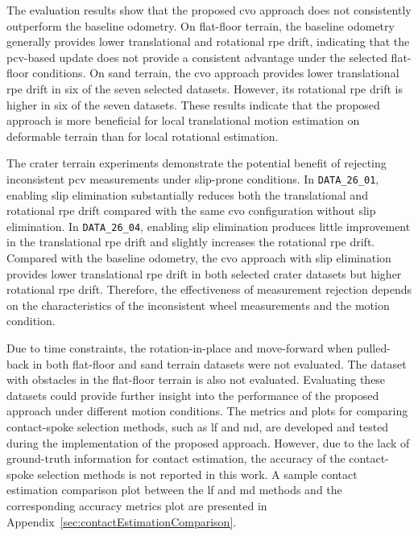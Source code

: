 \documentclass[report.tex]{subfiles}
\begin{document}
    The evaluation results show that the proposed \gls{cvo} approach does not consistently outperform the baseline odometry. On flat-floor terrain, the baseline odometry generally provides lower translational and rotational \gls{rpe} drift, indicating that the \gls{pcv}-based update does not provide a consistent advantage under the selected flat-floor conditions. On sand terrain, the \gls{cvo} approach provides lower translational \gls{rpe} drift in six of the seven selected datasets. However, its rotational \gls{rpe} drift is higher in six of the seven datasets. These results indicate that the proposed approach is more beneficial for local translational motion estimation on deformable terrain than for local rotational estimation.
    
    The crater terrain experiments demonstrate the potential benefit of rejecting inconsistent \gls{pcv} measurements under slip-prone conditions. In \texttt{DATA\_26\_01}, enabling slip elimination substantially reduces both the translational and rotational \gls{rpe} drift compared with the same \gls{cvo} configuration without slip elimination. In \texttt{DATA\_26\_04}, enabling slip elimination produces little improvement in the translational \gls{rpe} drift and slightly increases the rotational \gls{rpe} drift. Compared with the baseline odometry, the \gls{cvo} approach with slip elimination provides lower translational \gls{rpe} drift in both selected crater datasets but higher rotational \gls{rpe} drift. Therefore, the effectiveness of measurement rejection depends on the characteristics of the inconsistent wheel measurements and the motion condition.
    
    Due to time constraints, the rotation-in-place and move-forward when pulled-back in both flat-floor and sand terrain datasets were not evaluated. The dataset with obstacles in the flat-floor terrain is also not evaluated. Evaluating these datasets could provide further insight into the performance of the proposed approach under different motion conditions. The metrics and plots for comparing contact-spoke selection methods, such as \gls{lf} and \gls{md}, are developed and tested during the implementation of the proposed approach. However, due to the lack of ground-truth information for contact estimation, the accuracy of the contact-spoke selection methods is not reported in this work. A sample contact estimation comparison plot between the \gls{lf} and \gls{md} methods and the corresponding accuracy metrics plot are presented in Appendix~\ref{sec:contactEstimationComparison}. 
    
\end{document}
